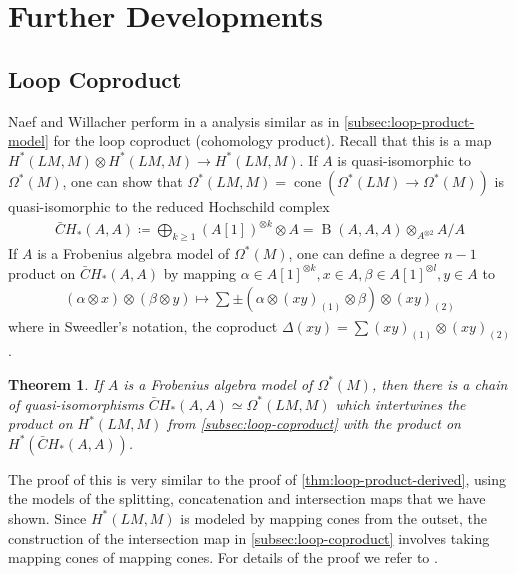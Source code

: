 \documentclass{scrartcl}
\theoremstyle{plain}
\newtheorem{theorem}{Theorem}[section]
\theoremstyle{definition}
\DeclareMathOperator{\cone}{cone}
\newcommand{\quiso}{\simeq}
\newcommand{\defeq}{\coloneqq}
\DeclareMathOperator{\Map}{Map}
\DeclareMathOperator{\BC}{B}
\begin{document}
\section{Further Developments}
\subsection{Loop Coproduct}
Naef and Willacher perform in \cite{naef2019string} a analysis similar as in \cref{subsec:loop-product-model} for the loop coproduct (cohomology product). Recall that this is a map $H^*(LM, M)\otimes H^*(LM, M)\to H^*(LM, M)$. If $A$ is quasi-isomorphic to $\Omega^*(M)$, one can show that $\Omega^*(LM, M) = \cone(\Omega^*(LM)\to \Omega^*(M))$ is quasi-isomorphic to the reduced Hochschild complex
\begin{align*}
\bar CH_*(A, A) \defeq \bigoplus_{k\geq 1} (A[1])^{\otimes  k} \otimes A = \BC(A, A, A)\otimes_{A^{\otimes 2}} A / A
\end{align*}
If $A$ is a Frobenius algebra model of $\Omega^*(M)$, one can define a degree $n-1$ product on $\bar CH_*(A, A)$ by mapping $\alpha\in A[1]^{\otimes k}, x\in A, \beta\in A[1]^{\otimes l}, y\in A$ to 
\begin{align*}
    (\alpha\otimes x)\otimes (\beta\otimes y)  \mapsto \sum \pm (\alpha \otimes (xy)_{(1)}\otimes\beta)\otimes (xy)_{(2)}
\end{align*}
where in Sweedler's notation, the coproduct $\Delta(xy) = \sum (xy)_{(1)} \otimes (xy)_{(2)}$.


\begin{theorem}{\cite[Thm. 1.3]{naef2019string}}
    If $A$ is a Frobenius algebra model of $\Omega^*(M)$, then there is a chain of quasi-isomorphisms $\bar CH_*(A, A)\quiso \Omega^*(LM, M)$ which intertwines the product on $H^*(LM, M)$ from \cref{subsec:loop-coproduct} with the product on $H^*(\bar CH_*(A, A))$.
\end{theorem}
The proof of this is very similar to the proof of \cref{thm:loop-product-derived}, using the models of the splitting, concatenation and intersection maps that we have shown. Since $H^*(LM, M)$ is modeled by mapping cones from the outset, the construction of the intersection map in \cref{subsec:loop-coproduct} involves taking mapping cones of mapping cones. For details of the proof we refer to \cite[Sec. 6]{naef2019string}.
\end{document}
